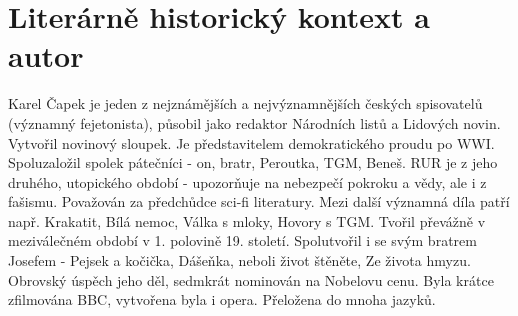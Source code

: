 \documentclass[11pt]{article}
\begin{document}
    \section*{Literárně historický kontext a autor}
    Karel Čapek je jeden z nejznámějších a nejvýznamnějších českých spisovatelů (významný fejetonista), působil jako redaktor Národních listů a Lidových novin.
    Vytvořil novinový sloupek. Je představitelem demokratického proudu po WWI.
    Spoluzaložil spolek pátečníci - on, bratr, Peroutka, TGM, Beneš.
    RUR je z jeho druhého, utopického období - upozorňuje na nebezpečí pokroku a vědy, ale i z fašismu. Považován za předchůdce sci-fi literatury.
    Mezi další významná díla patří např. Krakatit, Bílá nemoc, Válka s mloky, Hovory s TGM.
    Tvořil převážně v meziválečném období v 1. polovině 19. století.
    Spolutvořil i se svým bratrem Josefem - Pejsek a kočička, Dášeňka, neboli život štěněte, Ze života hmyzu.
    Obrovský úspěch jeho děl, sedmkrát nominován na Nobelovu cenu.
    Byla krátce zfilmována BBC, vytvořena byla i opera. Přeložena do mnoha jazyků.
\end{document}
